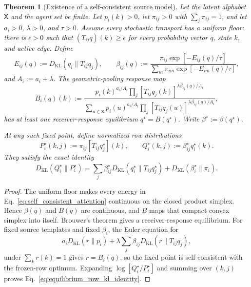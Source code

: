 \documentclass[11pt]{article}
\newtheorem{theorem}{Theorem}
\begin{document}
\begin{theorem}[Existence of a self-consistent source model]
\label{thm:self_consistent_source_equilibrium}
Let the latent alphabet $\mathsf{X}$ and the agent set be finite. Let $p_i(k)>0$, let $\pi_{ij}>0$ with $\sum_j\pi_{ij}=1$, and let $a_i>0$, $\lambda>0$, and $\tau>0$. Assume every stochastic transport has a uniform floor: there is $\epsilon>0$ such that $(T_{ij}q)(k)\ge\epsilon$ for every probability vector $q$, state $k$, and active edge. Define
\begin{equation}
E_{ij}(q):=D_{\mathrm{KL}}(q_i\|T_{ij}q_j),
\qquad
\beta_{ij}(q):=
\frac{\pi_{ij}\exp[-E_{ij}(q)/\tau]}
{\sum_m\pi_{im}\exp[-E_{im}(q)/\tau]},
\label{eq:self_consistent_attention}
\end{equation}
and $A_i:=a_i+\lambda$. The geometric-pooling response map
\begin{equation}
B_i(q)(k):=
\frac{
p_i(k)^{a_i/A_i}
\prod_j[T_{ij}q_j(k)]^{\lambda\beta_{ij}(q)/A_i}
}{
\sum_{u\in\mathsf{X}}
p_i(u)^{a_i/A_i}
\prod_j[T_{ij}q_j(u)]^{\lambda\beta_{ij}(q)/A_i}
},
\label{eq:self_consistent_response_map}
\end{equation}
has at least one receiver-response equilibrium $q^\star=B(q^\star)$. Write $\beta^\star:=\beta(q^\star)$.

At any such fixed point, define normalized row distributions
\begin{equation}
P_i^\star(k,j):=\pi_{ij}[T_{ij}q_j^\star](k),
\qquad
Q_i^\star(k,j):=\beta_{ij}^\star q_i^\star(k).
\label{eq:equilibrium_source_joint}
\end{equation}
They satisfy the exact identity
\begin{equation}
D_{\mathrm{KL}}(Q_i^\star\|P_i^\star)
=\sum_j\beta_{ij}^\star D_{\mathrm{KL}}(q_i^\star\|T_{ij}q_j^\star)
+D_{\mathrm{KL}}(\beta_i^\star\|\pi_i).
\label{eq:equilibrium_row_kl_identity}
\end{equation}
\end{theorem}

\begin{proof}
The uniform floor makes every energy in Eq.~\eqref{eq:self_consistent_attention} continuous on the closed product simplex. Hence $\beta(q)$ and $B(q)$ are continuous, and $B$ maps that compact convex simplex into itself. Brouwer's theorem gives a receiver-response equilibrium. For fixed source templates and fixed $\beta_i$, the Euler equation for
\begin{equation}
a_iD_{\mathrm{KL}}(r\|p_i)
+\lambda\sum_j\beta_{ij}D_{\mathrm{KL}}(r\|T_{ij}q_j),
\label{eq:frozen_row_geometric_pool_objective}
\end{equation}
under $\sum_k r(k)=1$ gives $r=B_i(q)$, so the fixed point is self-consistent with the frozen-row optimum. Expanding $\log[Q_i^\star/P_i^\star]$ and summing over $(k,j)$ proves Eq.~\eqref{eq:equilibrium_row_kl_identity}.
\end{proof}
\end{document}

